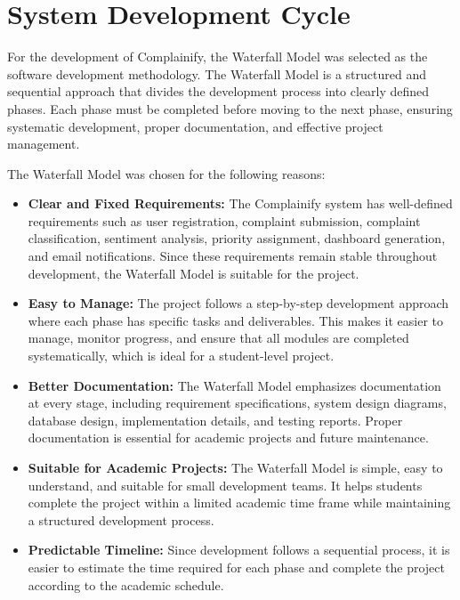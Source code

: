 \documentclass[12pt,a4paper]{report}
\begin{document}
\section{System Development Cycle}
For the development of Complainify, the Waterfall Model was selected as the software development methodology. The Waterfall Model is a structured and sequential approach that divides the development process into clearly defined phases. Each phase must be completed before moving to the next phase, ensuring systematic development, proper documentation, and effective project management.

The Waterfall Model was chosen for the following reasons:

\begin{itemize}[nolistsep]
    \item \textbf{Clear and Fixed Requirements:} The Complainify system has well-defined requirements such as user registration, complaint submission, complaint classification, sentiment analysis, priority assignment, dashboard generation, and email notifications. Since these requirements remain stable throughout development, the Waterfall Model is suitable for the project.
    
    \item \textbf{Easy to Manage:} The project follows a step-by-step development approach where each phase has specific tasks and deliverables. This makes it easier to manage, monitor progress, and ensure that all modules are completed systematically, which is ideal for a student-level project.
    
    \item \textbf{Better Documentation:} The Waterfall Model emphasizes documentation at every stage, including requirement specifications, system design diagrams, database design, implementation details, and testing reports. Proper documentation is essential for academic projects and future maintenance.
    
    \item \textbf{Suitable for Academic Projects:} The Waterfall Model is simple, easy to understand, and suitable for small development teams. It helps students complete the project within a limited academic time frame while maintaining a structured development process.
    
    \item \textbf{Predictable Timeline:} Since development follows a sequential process, it is easier to estimate the time required for each phase and complete the project according to the academic schedule.
\end{itemize}
\end{document}
